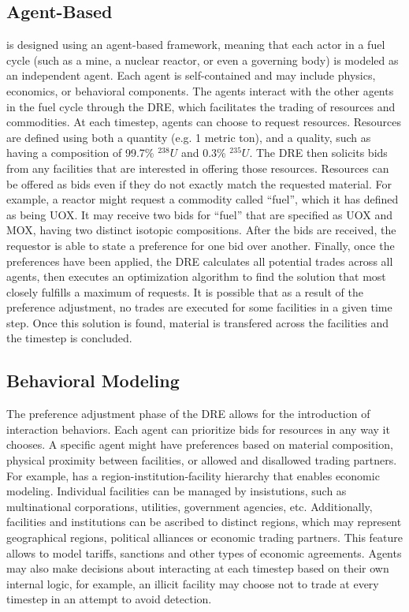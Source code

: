 \subsection{Agent-Based}
\Cyclus is designed using an agent-based framework, meaning that each actor in a fuel cycle (such as a mine, a nuclear reactor, or even a governing body) is modeled as an independent agent\cite{jennings_agent-based_2000, taylor2014agent}. Each agent is self-contained and may include physics, economics, or behavioral components\cite{huff_open_2011,gidden_agent-based_2013,gidden_agent-based_2015}.  The agents interact with the other agents in the fuel cycle through the \gls{DRE}, which facilitates the trading of resources and commodities\cite{gidden_agent-based_2014}.  At each timestep, agents can choose to request resources.  Resources are defined using both a quantity (e.g. 1 metric ton), and a quality, such as having a composition of 99.7\% $^{238}U$ and 0.3\% $^{235}U$.  The \gls{DRE} then solicits bids from any facilities that are interested in offering those resources. Resources can be offered as bids even if they do not exactly match the requested material. For example, a reactor might request a commodity called ``fuel'', which it has defined as being \gls{UOX}.  It may receive two bids for ``fuel'' that are specified as \gls{UOX} and \gls{MOX}, having two distinct isotopic compositions. After the bids are received, the requestor is able to state a preference for one bid over another. Finally, once the preferences have been applied, the \gls{DRE} calculates all potential trades across all agents, then executes an optimization algorithm to find the solution that most closely fulfills a maximum of requests. It is possible that as a result of the preference adjustment, no trades are executed for some facilities in a given time step.  Once this solution is found, material is transfered across the facilities and the timestep is concluded.

\subsection{Behavioral Modeling}
The preference adjustment phase of the \gls{DRE} allows for the introduction of interaction behaviors.  Each agent can prioritize bids for resources in any way it chooses. A specific agent might have preferences based on material composition, physical proximity between facilities, or allowed and disallowed trading partners. For example, \Cyclus has a region-institution-facility hierarchy that enables economic modeling\cite{oliver_geniusv2:_2009}.  Individual facilities can be managed by insistutions, such as multinational corporations, utilities, government agencies, etc.  Additionally, facilities and institutions can be ascribed to distinct regions, which may represent geographical regions, political alliances or economic trading partners. This feature allows \Cyclus to model tariffs, sanctions and other types of economic agreements.    Agents may also make decisions about interacting at each timestep based on their own internal logic, for example, an illicit facility may choose not to trade at every timestep in an attempt to avoid detection. 

